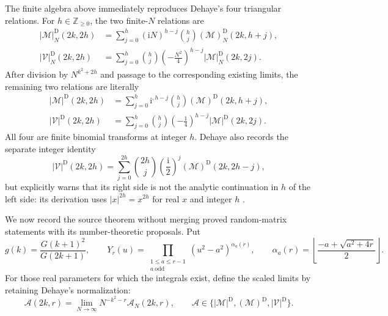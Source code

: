 The finite algebra above immediately reproduces Dehaye's four triangular relations.
For $h\in\mathbb Z_{\geq0}$, the two finite-$N$ relations are
\begin{align}
 |\mathcal M|_N^{\mathrm D}(2k,2h)
 &=\sum_{j=0}^{h}(\mathrm iN)^{h-j}\binom hj
   (\mathcal M)_N^{\mathrm D}(2k,h+j),
 \label{eq:dehaye-finite-relation-one}\\
 |\mathcal V|_N^{\mathrm D}(2k,2h)
 &=\sum_{j=0}^{h}\binom hj\left(-\frac{N^2}{4}\right)^{h-j}
   |\mathcal M|_N^{\mathrm D}(2k,2j).
 \label{eq:dehaye-finite-relation-three}
\end{align}
After division by $N^{k^2+2h}$ and passage to the corresponding existing limits,
the remaining two relations are literally
\begin{align}
 |\mathcal M|^{\mathrm D}(2k,2h)
 &=\sum_{j=0}^{h}\mathrm i^{,h-j}\binom hj
   (\mathcal M)^{\mathrm D}(2k,h+j),
 \label{eq:dehaye-limit-relation-two}\\
 |\mathcal V|^{\mathrm D}(2k,2h)
 &=\sum_{j=0}^{h}\binom hj\left(-\frac14\right)^{h-j}
   |\mathcal M|^{\mathrm D}(2k,2j).
 \label{eq:dehaye-limit-relation-four}
\end{align}
All four are finite binomial transforms at integer $h$.  Dehaye also records the
separate integer identity
\begin{equation}
 |\mathcal V|^{\mathrm D}(2k,2h)
 =\sum_{j=0}^{2h}\binom{2h}{j}
   \left(\frac{\mathrm i}{2}\right)^j
   (\mathcal M)^{\mathrm D}(2k,2h-j),
 \label{eq:dehaye-not-analytic-continuation}
\end{equation}
but explicitly warns that its right side is not the analytic continuation in $h$ of
the left side: its derivation uses $|x|^{2h}=x^{2h}$ for real $x$ and integer $h$
\cite[\S2]{dehaye2008}.

We now record the source theorem without merging proved random-matrix statements with
its number-theoretic proposals.  Put
\begin{equation}
 g(k)=\frac{G(k+1)^2}{G(2k+1)},\qquad
 Y_r(u)=\prod_{\substack{1\leq a\leq r-1\\a\ \mathrm{odd}}}
 (u^2-a^2)^{\alpha_a(r)},\qquad
 \alpha_a(r)=\left\lfloor\frac{-a+\sqrt{a^2+4r}}2\right\rfloor.
 \label{eq:dehaye-g-Y-alpha}
\end{equation}
For those real parameters for which the integrals exist, define the scaled limits
by retaining Dehaye's normalization:
\[
 \mathcal A(2k,r)=\lim_{N\to\infty}N^{-k^2-r}\mathcal A_N(2k,r),
 \qquad
 \mathcal A\in\{|\mathcal M|^{\mathrm D},(\mathcal M)^{\mathrm D},
 |\mathcal V|^{\mathrm D}\}.
\]

